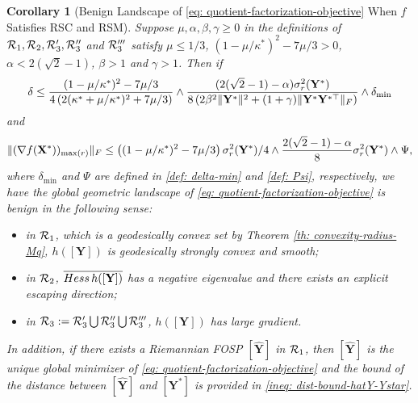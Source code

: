 \documentclass[11pt]{article}
\newtheorem{Corollary}{Corollary}
\newcommand{\0}{{\mathbf{0}}}
\newcommand{\1}{{\mathbf{1}}}
\newcommand{\X}{{\mathbf{X}}}
\newcommand{\Y}{{\mathbf{Y}}}
\newcommand{\cR}{{\cal R}}
\newcommand{\Hess}{{\rm Hess}}
\newcommand{\F}{{\rm F}}
\newcommand{\nc}{\normalcolor}
\begin{document}
\begin{Corollary}[Benign Landscape of \eqref{eq: quotient-factorization-objective} \label{coro: benign-landscape-f-well-conditioned} When $f$ Satisfies RSC and RSM] Suppose $\mu, \alpha, \beta,\gamma \geq 0$ in the definitions of $\cR_1, \cR_2, \cR_3', \cR_3''$ and $\cR_3'''$ satisfy $\mu \leq 1/3 $, $ \left( 1 - \mu /\kappa^* \right)^2 - 7\mu/3 > 0$, $ \alpha < 2(\sqrt{2} - 1) $, $\beta > 1$ and $\gamma > 1$. Then if 
\begin{equation} \label{ineq: overall-delta-condition}
	\delta \leq  \frac{(1-\mu/\kappa^*)^2 - 7\mu/3}{ 4\left(2 ( \kappa^* + \mu/\kappa^* )^2 + 7\mu/3 \right) } \wedge \frac{( 2 (\sqrt{2} -1) -\alpha ) \sigma^2_r(\Y^*)  }{8 \left( 2 \beta^2 \|\Y^*\|^2 + (1 + \gamma ) \| \Y^* \Y^{*\top} \|_\F   \right) } \wedge \delta_{\min}
\end{equation} and
\begin{equation} \label{ineq: overall-f-noise-condition}
	 \| (\nabla f(\X^*))_{\max(r)} \|_\F \leq \left( (1-\mu/\kappa^*)^2 - 7\mu/3 \right) \sigma^2_r(\Y^*)/4 \wedge \frac{ 2 ( \sqrt{2} - 1 ) - \alpha }{8} \sigma^2_r(\Y^*) \wedge \Psi,
\end{equation} where $\delta_{\min}$ and $\Psi$ are defined in \eqref{def: delta-min} and \eqref{def: Psi}, respectively, we have the global geometric landscape of \eqref{eq: quotient-factorization-objective} is benign in the following sense:
\begin{itemize}
	\item in $\cR_1$, which is a geodesically convex set by Theorem \ref{th: convexity-radius-Mq}, \nc  $h([\Y])$ is geodesically strongly convex and smooth;
	\item in $\cR_2$, $\overline{\Hess\, h([\Y])}$ has a negative eigenvalue and there exists an explicit escaping direction;
	\item in $\cR_3:= \cR_3' \bigcup \cR_3'' \bigcup \cR_3'''$, $h([\Y])$ has large gradient. 
\end{itemize} 

In addition, if there exists a Riemannian FOSP $[\widehat{\Y}]$ in $\cR_1$, then $[\widehat{\Y}]$ is the unique global minimizer of \eqref{eq: quotient-factorization-objective} and the bound of the distance between $[\widehat{\Y}]$ and $[\Y^*]$ is provided in \eqref{ineq: dist-bound-hatY-Ystar}.
\end{Corollary}
\end{document}
